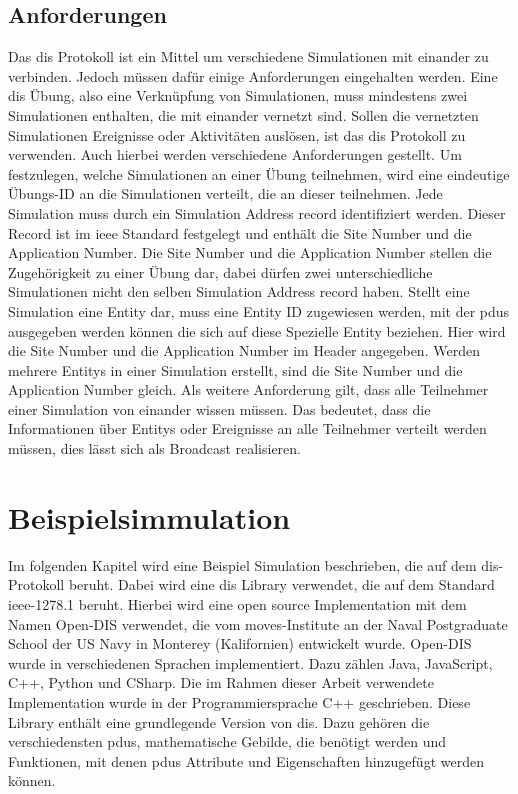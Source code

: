 \section{Anforderungen}
Das \ac{dis} Protokoll ist ein Mittel um verschiedene Simulationen mit einander zu verbinden. Jedoch müssen dafür einige Anforderungen eingehalten werden. Eine \ac{dis} Übung, also eine Verknüpfung von Simulationen, muss mindestens zwei Simulationen enthalten, die mit einander vernetzt sind. Sollen die vernetzten Simulationen Ereignisse oder Aktivitäten auslösen, ist das \ac{dis} Protokoll zu verwenden.  Auch hierbei werden verschiedene Anforderungen gestellt. Um festzulegen, welche Simulationen an einer Übung teilnehmen, wird eine eindeutige Übungs-ID an die Simulationen verteilt, die an dieser teilnehmen. Jede Simulation muss durch ein \glqq Simulation Address record\grqq{} identifiziert werden. Dieser Record ist im \ac{ieee} Standard festgelegt und enthält die \glqq Site Number\grqq{} und die  \glqq Application Number\grqq{}.
Die \glqq Site Number\grqq{} und die \glqq Application Number\grqq{} stellen die Zugehörigkeit zu einer Übung dar, dabei dürfen zwei unterschiedliche Simulationen nicht den selben \glqq Simulation Address record\grqq{} haben.  
Stellt eine Simulation eine Entity dar, muss eine Entity ID zugewiesen werden, mit der \acp{pdu} ausgegeben werden können die sich auf diese Spezielle Entity beziehen. Hier wird die \glqq Site Number\grqq{} und die  \glqq Application Number\grqq{} im Header angegeben. Werden  mehrere Entitys in einer Simulation erstellt, sind die  \glqq Site Number\grqq{} und die   \glqq Application Number\grqq{} gleich.
Als weitere Anforderung gilt, dass alle Teilnehmer einer Simulation von einander wissen müssen. Das bedeutet, dass die Informationen über Entitys oder Ereignisse an alle Teilnehmer verteilt werden müssen, dies lässt sich als Broadcast realisieren. 
\chapter{Beispielsimmulation}
Im folgenden Kapitel wird eine Beispiel Simulation beschrieben, die auf dem \ac{dis}-Protokoll beruht. Dabei wird eine \ac{dis} Library verwendet, die auf dem Standard \ac{ieee}-1278.1 beruht.
Hierbei wird eine \glqq open source\grqq{} Implementation mit dem Namen \glqq Open-DIS\grqq{} verwendet, die vom \ac{moves}-Institute an der Naval Postgraduate School der US Navy in Monterey (Kalifornien) entwickelt wurde.   \glqq Open-DIS\grqq{} wurde in verschiedenen Sprachen implementiert. Dazu zählen Java, JavaScript, C++, Python und CSharp. Die im Rahmen dieser Arbeit verwendete Implementation wurde in der Programmiersprache C++ geschrieben.    Diese Library enthält eine grundlegende Version von \ac{dis}. Dazu gehören die verschiedensten \acp{pdu}, mathematische Gebilde, die benötigt werden und Funktionen, mit denen \acp{pdu} Attribute und Eigenschaften hinzugefügt werden können. \cite{.13.10.2017}

